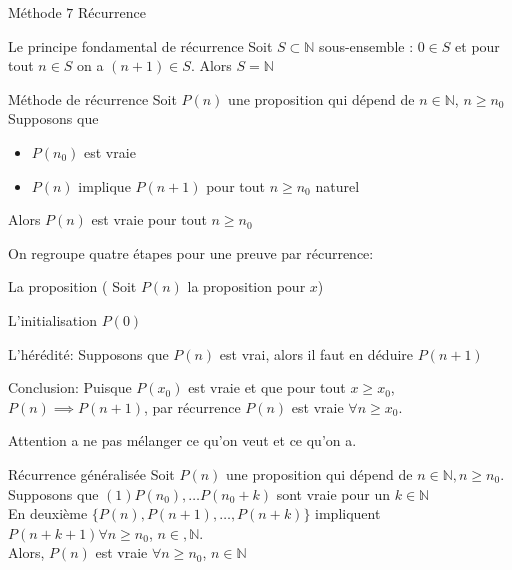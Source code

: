 
\begin{parag}{Méthode $7$ Récurrence}
    \begin{subparag}{Le principe fondamental de récurrence}
        Soit $S \subset \mathbb{N}$ sous-ensemble : $ 0 \in S$ et pour tout $n \in S$ on a $(n+1) \in S$. Alors $S = \mathbb{N}$
    \end{subparag}
    \begin{subparag}{Méthode de récurrence}
        Soit $P(n)$ une proposition qui dépend de $n \in \mathbb{N}$, $n \geq n_0$\\
Supposons que
        \begin{itemize}
            \item $P(n_0)$ est vraie
            \item $P(n)$ implique $P(n+1)$ pour tout $n \geq n_0$ naturel
        \end{itemize}
        Alors $P(n)$ est vraie pour tout $n \geq n_0$
    \end{subparag}
On regroupe quatre étapes pour une preuve par récurrence:
\begin{ennumerate}
\item La proposition ( Soit $P(n)$ la proposition pour $x$)
\item L'initialisation $P(0)$
\item L'hérédité: Supposons que $P(n)$ est vrai, alors il faut en déduire $P(n+1)$
\item Conclusion: Puisque $P(x_0)$ est vraie et que pour tout $x \geq x_0$, $P(n) \implies P(n+1)$, par récurrence $P(n)$ est vraie $ \forall n \geq x_0$. 
    
\end{ennumerate}
\begin{framedremark}
    Attention a ne pas mélanger ce qu'on veut et ce qu'on a.
\end{framedremark}

\end{parag}
\begin{parag}{Récurrence généralisée}
    Soit $P(n)$ une proposition qui dépend de $n \in \mathbb{N}, n \geq n_0$.\\
    Supposons que $(1) P(n_0), \dots P(n_0 + k)$ sont vraie pour un $k \in \mathbb{N}$\\
    En deuxième $\{ P(n), P(n+1), \dots, P(n+k)\}$ impliquent $P(n +k+1) \forall n \geq n_0$, $n \in , \mathbb{N}$.\\
    Alors, $P(n)$ est vraie $ \forall n \geq n_0$, $ n \in \mathbb{N}$
\end{parag}


